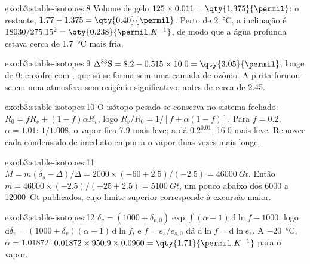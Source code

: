 \begin{solution}{exo:b3:stable-isotopes:8}
Volume de gelo $125\times0.011 = \qty{1.375}{\permil}$; o restante, $1.77 - 1.375 =
\qty{0.40}{\permil}$. Perto de \qty{2}{\celsius}, a inclinação é $18030/275.15^2 =
\qty{0.238}{\permil.K^{-1}}$, de modo que a água profunda estava cerca de \qty{1.7}{\celsius}
mais fria.
\end{solution}

\begin{solution}{exo:b3:stable-isotopes:9}
$\Delta^{33}\mathrm S = 8.2 - 0.515\times10.0 = \qty{3.05}{\permil}$, longe de 0:
enxofre com , que só se forma sem uma camada
de ozônio. A pirita formou-se em uma atmosfera sem oxigênio significativo, antes
de cerca de \qty{2.45}{\Ga}.
\end{solution}

\begin{solution}{exo:b3:stable-isotopes:10}
O isótopo pesado se conserva no sistema fechado: $R_0 = fR_v + (1 -
f)\alpha R_v$, logo $R_v/R_0 = 1/[f + \alpha(1 - f)]$. Para $f = 0.2$, $\alpha =
1.01$: $1/1.008$, o vapor fica \qty{7.9}{\permil} mais leve; a  dá
$0.2^{0.01}$, \qty{16.0}{\permil} mais leve. Remover cada condensado de imediato
empurra o vapor duas vezes mais longe.
\end{solution}

\begin{solution}{exo:b3:stable-isotopes:11}
$M = m(\delta_s - \Delta)/\Delta = 2000\times(-60 + 2.5)/(-2.5) = \qty{46000}{Gt}$.
Então $m = 46000\times(-2.5)/(-25 + 2.5) = \qty{5100}{Gt}$, um pouco abaixo dos
6000 a \qty{12000}{Gt} publicados, cujo limite superior corresponde à excursão
maior.
\end{solution}

\begin{solution}{exo:b3:stable-isotopes:12}
$\delta_v = (1000 + \delta_{v,0})\exp\int(\alpha - 1)\,\mathrm d\ln f - 1000$, logo
$\mathrm d\delta_v = (1000 + \delta_v)(\alpha - 1)\,\mathrm d\ln f$, e $f =
e_s/e_{s,0}$ dá $\mathrm d\ln f = \mathrm d\ln e_s$. A \qty{-20}{\celsius},
$\alpha = 1.01872$: $0.01872\times950.9\times0.0960 =
\qty{1.71}{\permil.K^{-1}}$ para o vapor.
\end{solution}

